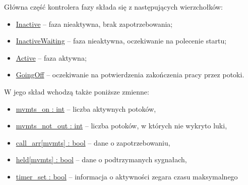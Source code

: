 \documentclass{pracamgr}
\theoremstyle{plain}
\begin{document}
Główna część kontrolera fazy składa się z następujących wierzchołków:
\begin{itemize}
  \item \url{Inactive} -- faza nieaktywna, brak zapotrzebowania;
  \item \url{InactiveWaiting} -- faza nieaktywna, oczekiwanie na
  polecenie startu;
  \item \url{Active} -- faza aktywna;
  \item \url{GoingOff} -- oczekiwanie na potwierdzenia zakończenia
  pracy przez potoki.
\end{itemize}
W jego skład wchodzą także poniższe zmienne:
\begin{itemize}
  \item \url{mvmts_on : int} -- liczba aktywnych potoków,
  \item \url{mvmts_not_out : int} -- liczba potoków, w których nie wykryto luki,
  \item \url{call_arr[mvmts] : bool} -- dane o zapotrzebowaniu,
  \item \url{held[mvmts] : bool} -- dane o podtrzymanych sygnałach,
  \item \url{timer_set : bool} -- informacja o aktywności zegara czasu
  maksymalnego
\end{itemize}
\end{document}
